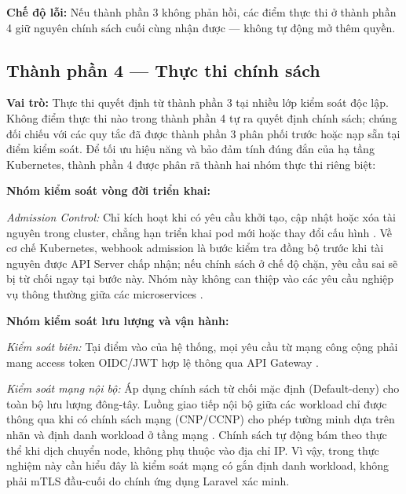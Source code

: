 \textbf{Chế độ lỗi:} Nếu thành phần 3 không phản hồi, các điểm thực thi ở thành phần 4 giữ nguyên chính sách cuối cùng nhận được --- không tự động mở thêm quyền.


\subsection{Thành phần 4 — Thực thi chính sách}

\textbf{Vai trò:} Thực thi quyết định từ thành phần 3 tại nhiều lớp kiểm soát độc lập. Không điểm thực thi nào trong thành phần 4 tự ra quyết định chính sách; chúng đối chiếu với các quy tắc đã được thành phần 3 phân phối trước hoặc nạp sẵn tại điểm kiểm soát. Để tối ưu hiệu năng và bảo đảm tính đúng đắn của hạ tầng Kubernetes, thành phần 4 được phân rã thành hai nhóm thực thi riêng biệt:

\textbf{Nhóm kiểm soát vòng đời triển khai:}

\textit{Admission Control:} Chỉ kích hoạt khi có yêu cầu khởi tạo, cập nhật hoặc xóa tài nguyên trong cluster, chẳng hạn triển khai pod mới hoặc thay đổi cấu hình \parencite{k8s_admission_controllers,gatekeeper_docs}. Về cơ chế Kubernetes, webhook admission là bước kiểm tra đồng bộ trước khi tài nguyên được API Server chấp nhận; nếu chính sách ở chế độ chặn, yêu cầu sai sẽ bị từ chối ngay tại bước này. Nhóm này không can thiệp vào các yêu cầu nghiệp vụ thông thường giữa các microservices \parencite{newman2022sigstore,sigstore_docs}.

\textbf{Nhóm kiểm soát lưu lượng và vận hành:}

\textit{Kiểm soát biên:} Tại điểm vào của hệ thống, mọi yêu cầu từ mạng công cộng phải mang access token OIDC/JWT hợp lệ thông qua API Gateway \parencite{kong_docs,rfc7519_jwt}.

\textit{Kiểm soát mạng nội bộ:} Áp dụng chính sách từ chối mặc định (Default-deny) cho toàn bộ lưu lượng đông-tây. Luồng giao tiếp nội bộ giữa các workload chỉ được thông qua khi có chính sách mạng (CNP/CCNP) cho phép tường minh dựa trên nhãn và định danh workload ở tầng mạng \parencite{cilium_docs,nist800204b_abac_microservices}. Chính sách tự động bám theo thực thể khi dịch chuyển node, không phụ thuộc vào địa chỉ IP. Vì vậy, trong thực nghiệm này cần hiểu đây là kiểm soát mạng có gắn định danh workload, không phải mTLS đầu-cuối do chính ứng dụng Laravel xác minh.

